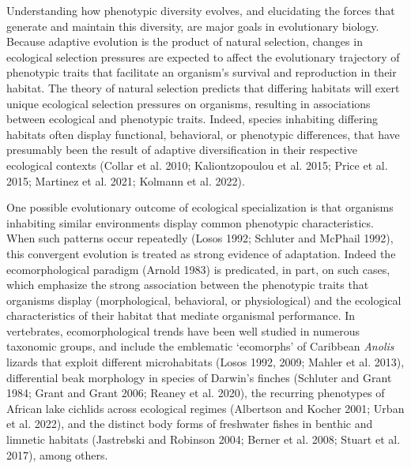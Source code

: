 \documentclass[
  11pt,
]{article}
\begin{document}
Understanding how phenotypic diversity evolves, and elucidating the
forces that generate and maintain this diversity, are major goals in
evolutionary biology. Because adaptive evolution is the product of
natural selection, changes in ecological selection pressures are
expected to affect the evolutionary trajectory of phenotypic traits that
facilitate an organism's survival and reproduction in their habitat. The
theory of natural selection predicts that differing habitats will exert
unique ecological selection pressures on organisms, resulting in
associations between ecological and phenotypic traits. Indeed, species
inhabiting differing habitats often display functional, behavioral, or
phenotypic differences, that have presumably been the result of adaptive
diversification in their respective ecological contexts (Collar et al.
2010; Kaliontzopoulou et al. 2015; Price et al. 2015; Martinez et al.
2021; Kolmann et al. 2022). \hfill\break

One possible evolutionary outcome of ecological specialization is that
organisms inhabiting similar environments display common phenotypic
characteristics. When such patterns occur repeatedly (Losos 1992;
Schluter and McPhail 1992), this convergent evolution is treated as
strong evidence of adaptation. Indeed the ecomorphological paradigm
(Arnold 1983) is predicated, in part, on such cases, which emphasize the
strong association between the phenotypic traits that organisms display
(morphological, behavioral, or physiological) and the ecological
characteristics of their habitat that mediate organismal performance. In
vertebrates, ecomorphological trends have been well studied in numerous
taxonomic groups, and include the emblematic `ecomorphs' of Caribbean
\emph{Anolis} lizards that exploit different microhabitats (Losos 1992,
2009; Mahler et al. 2013), differential beak morphology in species of
Darwin's finches (Schluter and Grant 1984; Grant and Grant 2006; Reaney
et al. 2020), the recurring phenotypes of African lake cichlids across
ecological regimes (Albertson and Kocher 2001; Urban et al. 2022), and
the distinct body forms of freshwater fishes in benthic and limnetic
habitats (Jastrebski and Robinson 2004; Berner et al. 2008; Stuart et
al. 2017), among others. \hfill\break
\end{document}
